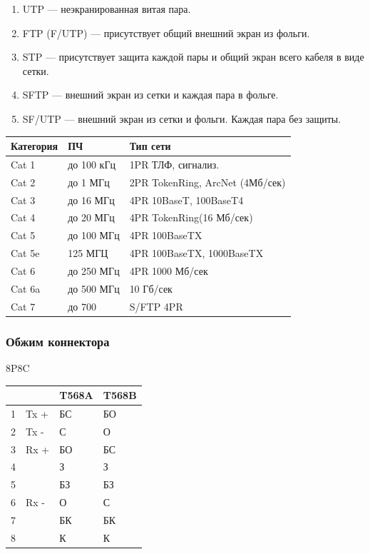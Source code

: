 \documentclass[12pt, russian, oneside, article]{ncc}
\begin{document}
\begin{enumerate}
\item UTP --- неэкранированная витая пара.
\item FTP (F/UTP) --- присутствует общий внешний экран из фольги.
\item STP --- присутствует защита каждой пары и общий экран всего кабеля в виде сетки.
\item SFTP --- внешний экран из сетки и каждая пара в фольге.
\item SF/UTP --- внешний экран из сетки и фольги. Каждая пара без защиты.
\end{enumerate}


\begin{center}
\begin{tabular}{lll}
 Категория  &  ПЧ          &  Тип сети                         \\
\hline
 Cat 1      &  до 100 кГц  &  1PR ТЛФ, сигнализ.               \\
 Cat 2      &  до 1 МГц    &  2PR TokenRing, ArcNet (4Мб/сек)  \\
 Cat 3      &  до 16 МГц   &  4PR 10BaseT, 100BaseT4           \\
 Cat 4      &  до 20 МГц   &  4PR TokenRing(16 Мб/сек)         \\
 Cat 5      &  до 100 МГц  &  4PR 100BaseTX                    \\
\hline
 Cat 5e     &  125 МГЦ     &  4PR 100BaseTX, 1000BaseTX        \\
 Cat 6      &  до 250 МГц  &  4PR 1000 Мб/сек                  \\
 Cat 6a     &  до 500 МГц  &  10 Гб/сек                        \\
 Cat 7      &  до 700      &  S/FTP 4PR                        \\
\end{tabular}
\end{center}
\subsubsection{Обжим коннектора}
\label{sec-4_5_2}


8P8C

\begin{center}
\begin{tabular}{rlll}
    &        &  T568A  &  T568B  \\
\hline
 1  &  Tx +  &  БС     &  БО     \\
 2  &  Tx -  &  С      &  О      \\
 3  &  Rx +  &  БО     &  БС     \\
 4  &        &  З      &  З      \\
 5  &        &  БЗ     &  БЗ     \\
 6  &  Rx -  &  О      &  С      \\
 7  &        &  БК     &  БК     \\
 8  &        &  К      &  К      \\
\end{tabular}
\end{center}
\end{document}
